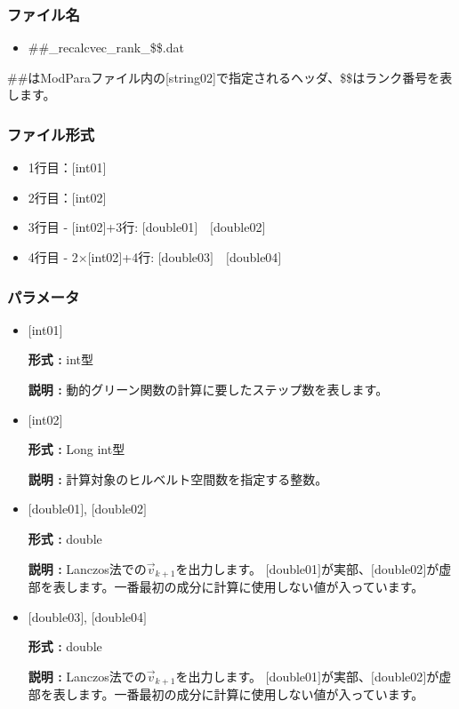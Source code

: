 \subsubsection{ファイル名}
\begin{itemize}
   \item{\#\#\_recalcvec\_rank\_\$\$.dat}
\end{itemize}
  \#\#はModParaファイル内の[string02]で指定されるヘッダ、\$\$はランク番号を表します。

\subsubsection{ファイル形式}
 \begin{itemize}
   \item  1行目：$[$int01$]$
   \item  2行目：$[$int02$]$
   \item  3行目 - $[$int02$]$+3行: $[$double01$]$~~$[$double02$]$
   \item  4行目 - 2$\times$$[$int02$]$+4行: $[$double03$]$~~$[$double04$]$
  \end{itemize}
\subsubsection{パラメータ}
 \begin{itemize}

  \item  $[$int01$]$

 {\bf 形式 :} int型

 {\bf 説明 :} 動的グリーン関数の計算に要したステップ数を表します。

  \item  $[$int02$]$

 {\bf 形式 :} Long int型

{\bf 説明 :} 計算対象のヒルベルト空間数を指定する整数。

  \item  $[$double01$]$, $[$double02$]$ 

 {\bf 形式 :} double 

{\bf 説明 :}  Lanczos法での$\vec{v}_{k+1}$を出力します。 $[$double01$]$が実部、$[$double02$]$が虚部を表します。一番最初の成分に計算に使用しない値が入っています。\\

 \item  $[$double03$]$, $[$double04$]$ 

 {\bf 形式 :} double 

{\bf 説明 :}  Lanczos法での$\vec{v}_{k+1}$を出力します。 $[$double01$]$が実部、$[$double02$]$が虚部を表します。一番最初の成分に計算に使用しない値が入っています。\\
 
\end{itemize}

